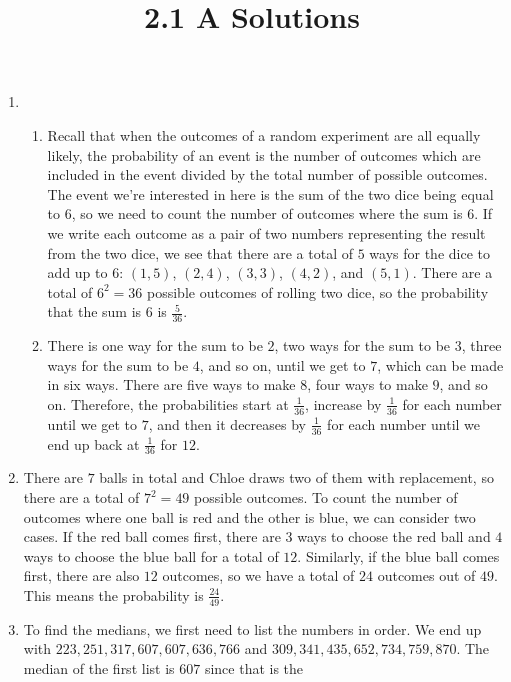 \documentclass{article}
\title{2.1 A Solutions}
\author{}
\date{}
\begin{document}
\maketitle

\begin{enumerate}
	\item \begin{enumerate}
			\item Recall that when the outcomes of a random experiment are all 
				equally likely, the probability of an event is the number of 
				outcomes which are included in the event divided by the total 
				number of possible outcomes. The event we're interested in here 
				is the sum of the two dice being equal to $6$, so we need to 
				count the number of outcomes where the sum is $6$. If we write 
				each outcome as a pair of two numbers representing the result 
				from the two dice, we see that there are a total of $5$ ways for 
				the dice to add up to $6$: $(1, 5)$, $(2, 4)$, $(3, 3)$, $(4, 
				2)$, and $(5, 1)$. There are a total of $6^2 = 36$ possible 
				outcomes of rolling two dice, so the probability that the sum is 
				$6$ is $\frac{5}{36}$.
			\item There is one way for the sum to be $2$, two ways for the sum 
				to be $3$, three ways for the sum to be $4$, and so on, until we 
				get to $7$, which can be made in six ways. There are five ways 
				to make $8$, four ways to make $9$, and so on. Therefore, the 
				probabilities start at $\frac{1}{36}$, increase by 
				$\frac{1}{36}$ for each number until we get to $7$, and then it 
				decreases by $\frac{1}{36}$ for each number until we end up back 
				at $\frac{1}{36}$ for $12$.
		\end{enumerate}
	\item There are $7$ balls in total and Chloe draws two of them with 
		replacement, so there are a total of $7^2 = 49$ possible outcomes. To 
		count the number of outcomes where one ball is red and the other is 
		blue, we can consider two cases. If the red ball comes first, there are 
		$3$ ways to choose the red ball and $4$ ways to choose the blue ball for 
		a total of $12$. Similarly, if the blue ball comes first, there are also 
		$12$ outcomes, so we have a total of $24$ outcomes out of $49$. This 
		means the probability is $\frac{24}{49}$.
	\item To find the medians, we first need to list the numbers in order. We 
		end up with $223, 251, 317, 607, 607, 636, 766$ and $309, 341, 435, 652, 
		734, 759, 870$. The median of the first list is $607$ since that is the 

\end{enumerate}
\end{document}

